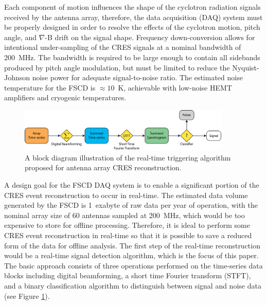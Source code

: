 Each component of motion influences the shape of the cyclotron radiation signals received by the antenna array, therefore, the data acquisition (DAQ) system must be properly designed in order to resolve the effects of the cyclotron motion, pitch angle, and $\nabla$-B drift on the signal shape. Frequency down-conversion allows for intentional under-sampling of the CRES signals at a nominal bandwidth of 200~MHz. The bandwidth is required to be large enough to contain all sidebands produced by pitch angle modulation, but must be limited to reduce the Nyquist-Johnson noise power for adequate signal-to-noise ratio. The estimated noise temperature for the FSCD is $\approx 10$~K, achievable with low-noise HEMT amplifiers and cryogenic temperatures.


\begin{figure}[htbp]
    \centering
    \includegraphics[width=0.9\textwidth]{figs/Chapter-4/230807_trigger_flow.png}
    \caption{A block diagram illustration of the real-time triggering algorithm proposed for antenna array CRES reconstruction.}
    \label{fig:signal_detection_routine}
\end{figure}

A design goal for the FSCD DAQ system is to enable a significant portion of the CRES event reconstruction to occur in real-time. The estimated data volume generated by the FSCD is 1~exabyte of raw data per year of operation, with the nominal array size of 60 antennas sampled at 200~MHz, which would be too expensive to store for offline processing. Therefore, it is ideal to perform some CRES event reconstruction in real-time so that it is possible to save a reduced form of the data for offline analysis. The first step of the real-time reconstruction would be a real-time signal detection algorithm, which is the focus of this paper. The basic approach consists of three operations performed on the time-series data blocks including digital beamforming, a short time Fourier transform (STFT), and a binary classification algorithm to distinguish between signal and noise data (see Figure \ref{fig:signal_detection_routine}). %


